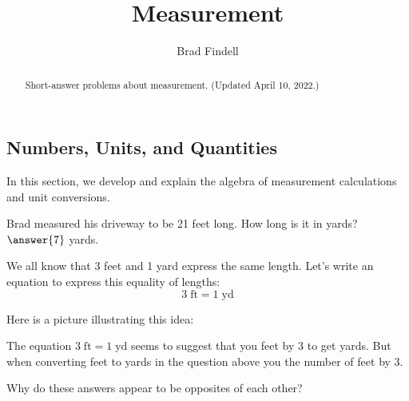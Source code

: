 \documentclass[nooutcomes]{ximera}
\title{Measurement}
\author{Brad Findell}
\begin{document}
\begin{abstract}
Short-answer problems about measurement.  (Updated April 10, 2022.)
\end{abstract}
\maketitle




\subsection{Numbers, Units, and Quantities}
In this section, we develop and explain the algebra of measurement calculations and unit conversions. 

\begin{question}
Brad measured his driveway to be 21 feet long.  How long is it in yards?  
$\answer{7}$ yards.  
\end{question}

We all know that 3 feet and 1 yard express the same length.  Let's write an equation to express this equality of lengths: 
\[
3\;\textrm{ft} = 1\;\textrm{yd}
\]

Here is a picture illustrating this idea:  

\begin{image}
\end{image}

\begin{question}
The equation $3\;\textrm{ft} = 1\;\textrm{yd}$ seems to suggest that you  feet by 3 to get yards.  But when converting feet to yards in the question above you  the number of feet by 3.  

Why do these answers appear to be opposites of each other?  
\end{question}
\end{document}
